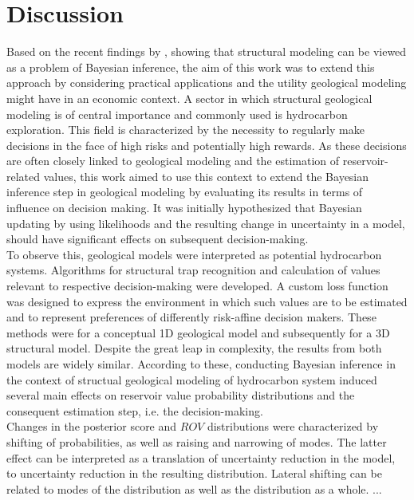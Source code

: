 	\chapter{Discussion}\label{cha:discussion}
	Based on the recent findings by \citet{delaVarga2016}, showing that structural modeling can be viewed as a problem of Bayesian inference, the aim of this work was to extend this approach by considering practical applications and the utility geological modeling might have in an economic context. A sector in which structural geological modeling is of central importance and commonly used is hydrocarbon exploration. This field is characterized by the necessity to regularly make decisions in the face of high risks and potentially high rewards. As these decisions are often closely linked to geological modeling and the estimation of reservoir-related values, this work aimed to use this context to extend the Bayesian inference step in geological modeling by evaluating its results in terms of influence on decision making. It was initially hypothesized that Bayesian updating by using likelihoods and the resulting change in uncertainty in a model, should have significant effects on subsequent decision-making.\\
	To observe this, geological models were interpreted as potential hydrocarbon systems. Algorithms for structural trap recognition and calculation of values relevant to respective decision-making were developed. A custom loss function was designed to express the environment in which such values are to be estimated and to represent preferences of differently risk-affine decision makers. These methods were for a conceptual 1D geological model and subsequently for a 3D structural model. Despite the great leap in complexity, the results from both models are widely similar. According to these, conducting Bayesian inference in the context of structual geological modeling of hydrocarbon system induced several main effects on reservoir value probability distributions and the consequent estimation step, i.e. the decision-making.\\
	Changes in the posterior score and $ROV$ distributions were characterized by shifting of probabilities, as well as raising and narrowing of modes. The latter effect can be interpreted as a translation of uncertainty reduction in the model, to uncertainty reduction in the resulting distribution. Lateral shifting can be related to modes of the distribution as well as the distribution as a whole. ...\\
